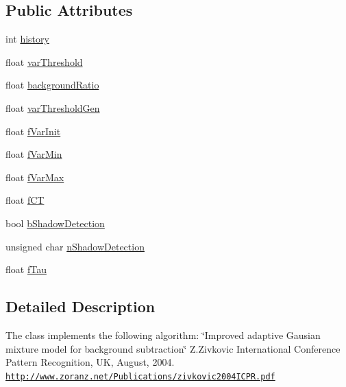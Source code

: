 \subsection*{Public Attributes}
\begin{DoxyCompactItemize}
\item 
int \hyperlink{classcv_1_1ocl_1_1MOG2_a94f6103a28c8757089c37f0855102e1d}{history}
\item 
float \hyperlink{classcv_1_1ocl_1_1MOG2_a0872335afe646e84f0dc0e1bf9c370da}{var\-Threshold}
\item 
float \hyperlink{classcv_1_1ocl_1_1MOG2_a6ce6183a92badc37d7be1572ceb95e91}{background\-Ratio}
\item 
float \hyperlink{classcv_1_1ocl_1_1MOG2_a976a659d47c216c12728a639fdf435b7}{var\-Threshold\-Gen}
\item 
float \hyperlink{classcv_1_1ocl_1_1MOG2_ada8de5265e604b68baf48f5135406b5d}{f\-Var\-Init}
\item 
float \hyperlink{classcv_1_1ocl_1_1MOG2_a31a2fd79ea05986c084cb3fd2d69bc57}{f\-Var\-Min}
\item 
float \hyperlink{classcv_1_1ocl_1_1MOG2_a58b683df18cb7456f5b2e7e28c229a10}{f\-Var\-Max}
\item 
float \hyperlink{classcv_1_1ocl_1_1MOG2_a47f4b7400e781ff021dbaba79f84ea38}{f\-C\-T}
\item 
bool \hyperlink{classcv_1_1ocl_1_1MOG2_acfef606ea1a73b3ff31527eebd29bc0f}{b\-Shadow\-Detection}
\item 
unsigned char \hyperlink{classcv_1_1ocl_1_1MOG2_a2a853b7c187269451503e3b7bb81e35d}{n\-Shadow\-Detection}
\item 
float \hyperlink{classcv_1_1ocl_1_1MOG2_a29781e10eeabae3095ba624ecaea3c35}{f\-Tau}
\end{DoxyCompactItemize}


\subsection{Detailed Description}
The class implements the following algorithm\-: \char`\"{}\-Improved adaptive Gausian mixture model for background subtraction\char`\"{} Z.\-Zivkovic International Conference Pattern Recognition, U\-K, August, 2004. \href{http://www.zoranz.net/Publications/zivkovic2004ICPR.pdf}{\tt http\-://www.\-zoranz.\-net/\-Publications/zivkovic2004\-I\-C\-P\-R.\-pdf} 

